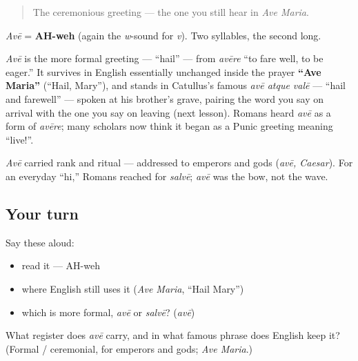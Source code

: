 \label{lesson:LA-C01-ave}



\begin{quote}
The ceremonious greeting — the one you still hear in \emph{Ave Maria}.
\end{quote}

\begin{sounds}
\emph{Avē} = \textbf{AH-weh} (again the \emph{w}-sound for \emph{v}). Two syllables, the second long.
\end{sounds}

\begin{cousinweb}
\emph{Avē} is the more formal greeting — \textquotedblleft{}hail\textquotedblright{} — from \emph{avēre} \textquotedblleft{}to fare well, to be eager.\textquotedblright{} It survives in English essentially unchanged inside the prayer \textbf{\textquotedblleft{}Ave Maria\textquotedblright{}} (\textquotedblleft{}Hail, Mary\textquotedblright{}), and stands in Catullus's famous \emph{avē atque valē} — \textquotedblleft{}hail and farewell\textquotedblright{} — spoken at his brother's grave, pairing the word you say on arrival with the one you say on leaving (next lesson). Romans heard \emph{avē} as a form of \emph{avēre}; many scholars now think it began as a Punic greeting meaning \textquotedblleft{}live!\textquotedblright{}.
\end{cousinweb}

\begin{culture}
\emph{Avē} carried rank and ritual — addressed to emperors and gods (\emph{avē, Caesar}). For an everyday \textquotedblleft{}hi,\textquotedblright{} Romans reached for \emph{salvē}; \emph{avē} was the bow, not the wave.
\end{culture}

\subsection*{Your turn}
Say these aloud:

\begin{itemize}
\raggedright
  \item read it — AH-weh
  \item where English still uses it (\emph{Ave Maria}, \textquotedblleft{}Hail Mary\textquotedblright{})
  \item which is more formal, \emph{avē} or \emph{salvē}? (\emph{avē})
\end{itemize}

\begin{tcolorbox}[breakable,colback=teal!4,colframe=teal!35!black,title={Before you move on}]
What register does \emph{avē} carry, and in what famous phrase does English keep it? (Formal / ceremonial, for emperors and gods; \emph{Ave Maria}.)
\end{tcolorbox}
